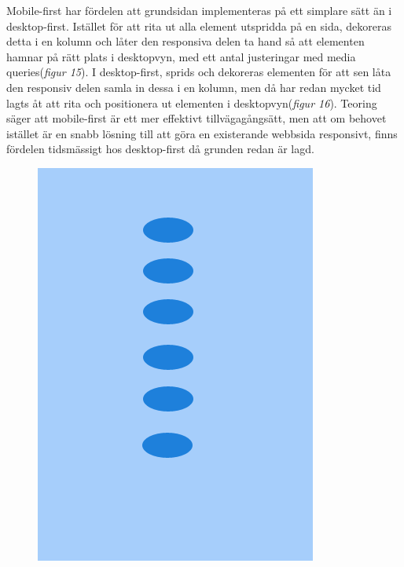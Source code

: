 \documentclass[11pt]{article}
\begin{document}
Mobile-first har fördelen att grundsidan implementeras på ett simplare sätt än i desktop-first. Istället för att rita ut alla element utspridda på en sida, dekoreras detta i en kolumn och låter den responsiva delen ta hand så att elementen hamnar på rätt plats i desktopvyn, med ett antal justeringar med media queries(\textit{figur 15}). I desktop-first, sprids och dekoreras elementen för att sen låta den responsiv delen samla in dessa i en kolumn, men då har redan mycket tid lagts åt att rita och positionera ut elementen i desktopvyn(\textit{figur 16}). Teoring säger att mobile-first är ett mer effektivt tillvägagångsätt, men att om behovet istället är en snabb lösning till att göra en existerande webbsida responsivt, finns fördelen tidsmässigt hos desktop-first då grunden redan är lagd.
\\
\begin{figure}[H]
\centerline{%
\includegraphics[scale=0.27]{pics/mobiledots.png}\hspace{2em}%
}
\end{figure}
\end{document}
